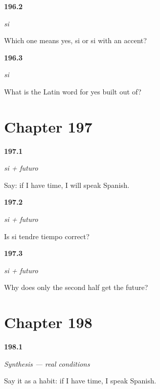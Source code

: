 \noindent\begin{minipage}[t]{\linewidth}
\raggedright
\hypertarget{review-ES-C55-si-accent}{\textbf{196.2}} \emph{si}\par
\small Which one means yes, si or si with an accent?
\end{minipage}\par\medskip

\noindent\begin{minipage}[t]{\linewidth}
\raggedright
\hypertarget{review-ES-C55-si-etymon}{\textbf{196.3}} \emph{si}\par
\small What is the Latin word for yes built out of?
\end{minipage}\par\medskip

\section*{Chapter 197}

\noindent\begin{minipage}[t]{\linewidth}
\raggedright
\hypertarget{review-ES-C55-si-futuro-say}{\textbf{197.1}} \emph{si + futuro}\par
\small Say: if I have time, I will speak Spanish.
\end{minipage}\par\medskip

\noindent\begin{minipage}[t]{\linewidth}
\raggedright
\hypertarget{review-ES-C55-si-futuro-trap}{\textbf{197.2}} \emph{si + futuro}\par
\small Is si tendre tiempo correct?
\end{minipage}\par\medskip

\noindent\begin{minipage}[t]{\linewidth}
\raggedright
\hypertarget{review-ES-C55-si-futuro-why}{\textbf{197.3}} \emph{si + futuro}\par
\small Why does only the second half get the future?
\end{minipage}\par\medskip

\section*{Chapter 198}

\noindent\begin{minipage}[t]{\linewidth}
\raggedright
\hypertarget{review-ES-C55-sintesis-condicion-habit}{\textbf{198.1}} \emph{Synthesis — real conditions}\par
\small Say it as a habit: if I have time, I speak Spanish.
\end{minipage}\par\medskip

